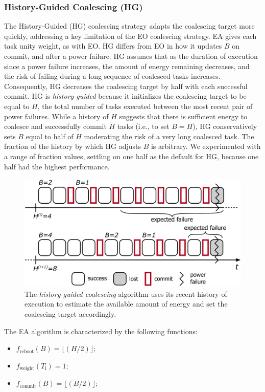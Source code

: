 \subsubsection{History-Guided Coalescing (HG)}
\label{subsec:energyAware}

The History-Guided (HG) coalescing strategy adapts the coalescing target more
quickly, addressing a key limitation of the EO coalescing strategy.  
%
EA gives each task unity weight, as with EO.  
%
HG differs from EO in how it updates $B$ on commit, and after a power failure.
%
HG assumes that as the duration of execution since a power failure increases,
the amount of energy remaining decreases, and the risk of failing during a long
sequence of coalesced tasks increases.  
%
Consequently, HG decreases the coalescing target by half with each successful commit.
%
HG is {\em history-guided} because it initializes the coalescing target to be
equal to $H$, the total number of tasks executed between the most recent pair
of power failures.
%
While a history of $H$ suggests that there is sufficient energy to coalesce and
successfully commit $H$ tasks (i.e., to set $B = H$), HG conservatively sets $B$ equal to half
of $H$ moderating the risk of a very long coalesced task. 
%
The fraction of the history by which HG adjusts $B$ is arbitrary.
We experimented with a range of fraction values, settling on one half as the
default for HG, because one half had the highest performance. 

\begin{figure}
	\centering
	\includegraphics[width=0.5\columnwidth]{figures/energy-aware-coal.pdf}
	\caption{The {\em history-guided coalescing} algorithm uses its recent history of execution to estimate the available amount of energy and set the coalescing target accordingly.}
	\label{fig:energyAware}
\end{figure}

The EA algorithm is characterized by the following functions: 

\begin{itemize}
\item $f_\text{reboot}(B) = \lfloor(H / 2)\rfloor;$
\item $f_\text{weight}(T_\text{i}) =  1$; 
\item $f_\text{commit}(B) = \lfloor(B / 2)\rfloor;$ 
\end{itemize}

